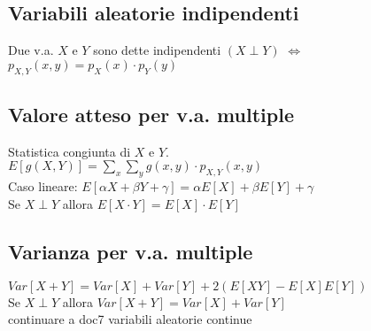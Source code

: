 \documentclass{article}
\begin{document}
\begin{multicols*}{3}
		\subsection{Variabili aleatorie indipendenti}
		Due v.a. \(X\) e \(Y\) sono dette indipendenti \((X\perp Y)\) \(\iff\) \(p_{X,Y} (x,y) = p_X (x)\cdot p_Y (y) \)\\
		
		\subsection{Valore atteso per v.a. multiple}
		Statistica congiunta di \(X\) e \(Y\).\\
		\(E[g(X,Y)] = \sum_{x}^{}\sum_{y}^{} g(x,y) \cdot p_{X,Y} (x,y)\)\\
		Caso lineare: \(E[\alpha X + \beta Y + \gamma] = \alpha E[X] + \beta E[Y] + \gamma\) \\
		Se \(X \perp Y\) allora \(E[X \cdot Y] = E[X] \cdot E[Y]\)
		
		\subsection{Varianza per v.a. multiple}
		\(Var[X+Y]= Var[X] + Var[Y] +2(E[XY] -E[X]E[Y])\)\\
		Se \(X\perp Y\) allora \(Var[X+Y] = Var[X] + Var[Y]\)\\
		
		
		continuare a doc7 variabili aleatorie continue
		
		
		
		
		
		 
		
		
		
		
		
		
		
	\end{multicols*}
\end{document}
